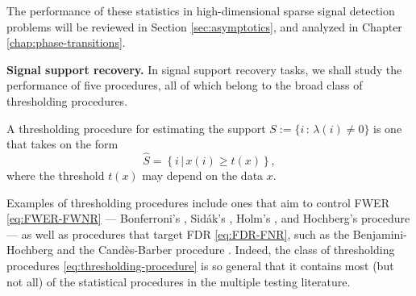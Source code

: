  The performance of these statistics in high-dimensional 
sparse signal detection problems will be reviewed in Section \ref{sec:asymptotics}, and analyzed in Chapter \ref{chap:phase-transitions}.

\medskip

{\bf Signal support recovery.}
In signal support recovery tasks, we shall study the performance of five procedures, all of which belong to the broad class of thresholding procedures.
\begin{definition}
A thresholding procedure for estimating the support 
$S:=\{i\, :\, \lambda(i)\neq0\}$ is one that takes on the form
\begin{equation} \label{eq:thresholding-procedure}
    \widehat{S} = \left\{i\,|\,x(i) \ge t(x)\right\},
\end{equation}
where the threshold $t(x)$ may depend on the data $x$.
\end{definition}

Examples of thresholding procedures include ones that aim to control FWER \eqref{eq:FWER-FWNR} --- Bonferroni's \citep{dunn1961multiple}, Sid\'ak's \citep{vsidak1967rectangular}, Holm's \citep{holm1979simple}, and Hochberg's procedure \citep{hochberg1988sharper} --- as well as procedures that target FDR \eqref{eq:FDR-FNR}, such as the Benjamini-Hochberg \cite{benjamini1995controlling} and the  Cand\`es-Barber procedure \citep{barber2015controlling}.
Indeed, the class of thresholding procedures \eqref{eq:thresholding-procedure} is so general that it contains most (but not all) of the statistical procedures in the multiple testing literature.



